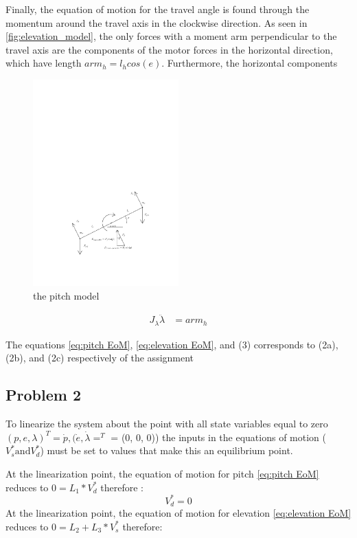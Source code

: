 Finally, the equation of motion for the travel angle is found through
the momentum around the travel axis in the  clockwise direction. As
seen in \cref{fig:elevation_model}, the only forces with a moment arm
perpendicular to the travel axis are the components of the motor
forces in the horizontal direction, which have length $arm_h =
l_hcos(e)$. Furthermore, the horizontal components


\begin{figure}[H]
  \caption{the pitch model}
  \label{fig:pitch_model}
  \includegraphics[width=0.5\textwidth]{images/pitch_model}
\end{figure}

\begin{align*}
\label{eq:lambda EoM}
  J_\lambda\ddot{\lambda} &= arm_h
\end{align*}

The equations \cref{eq:pitch EoM}, \ref{eq:elevation EoM}, and (3) corresponds to (2a), (2b), and (2c) respectively of the assignment \cite[p.13]{assignment}

\subsection{Problem 2}
To linearize the system about the point with all state variables equal
to zero $(p, e, \lambda)^T = \dot{p},(\dot{e},\dot{\lambda}=^T $ = (0, 0, 0))
the inputs in the equations of motion ($V^{*}_{s} \text{and} V^{*}_{d}$) must be set to
values that make this an equilibrium point.

At the linearization point, the equation of motion for pitch
\ref{eq:pitch EoM} reduces to $0 = L_{1} *
V^{*}_{d}$ therefore
:
\begin{equation}
	\label{eq:V^*_d value}
  V^{*}_{d} = 0
\end{equation}
At the linearization point, the equation of motion for elevation
\ref{eq:elevation EoM} reduces to $0 = L_{2} +
L_{3}*V^{*}_{s}$ therefore:

